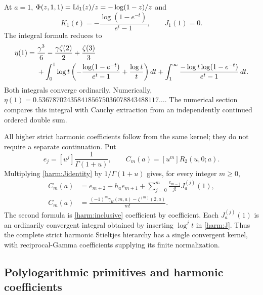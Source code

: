At $a=1$, $\Phi(z,1,1)=\operatorname{Li}_1(z)/z=-\log(1-z)/z$ and
\[
 K_1(t)=-\frac{\log(1-e^{-t})}{e^t-1},\qquad J_1(1)=0.
\]
The integral formula reduces to
\begin{align}\label{harm:etaone}
 \eta(1)={}&\frac{\gamma^3}6-\frac{\gamma\zeta(2)}2+
                \frac{\zeta(3)}3\notag\\
 &+\int_0^1\log t\left(
      -\frac{\log(1-e^{-t})}{e^t-1}+\frac{\log t}{t}\right)dt
 +\int_1^\infty\frac{-\log t\log(1-e^{-t})}{e^t-1}\,dt.
\end{align}
Both integrals converge ordinarily. Numerically,
$\eta(1)=0.5367870243584185675036078843488117\ldots$.
The numerical section compares this integral with Cauchy extraction
from an independently continued ordered double sum.

All higher strict harmonic coefficients follow from the same kernel;
they do not require a separate continuation. Put
\[
 e_j=[u^j]\frac1{\Gamma(1+u)},\qquad
 C_m(a)=[u^m]R_2(u,0;a).
\]
Multiplying \eqref{harm:Jidentity} by $1/\Gamma(1+u)$ gives, for
every integer $m\ge0$,
\begin{align}\label{harm:allcoefficients}
 C_m(a)&=e_{m+2}+h_a e_{m+1}
       +\sum_{j=0}^m\frac{e_{m-j}}{j!}J_a^{(j)}(1),\\
 C_m(a)&=\frac{(-1)^m\gamma_H(m,a)-\zeta^{(m)}(2,a)}{m!}.
                  \label{harm:allconversion}
\end{align}
The second formula is \eqref{harm:inclusive} coefficient by
coefficient. Each $J_a^{(j)}(1)$ is an ordinarily convergent integral
obtained by inserting $\log^j t$ in \eqref{harm:J}. Thus the complete
strict harmonic Stieltjes hierarchy has a single convergent kernel,
with reciprocal-Gamma coefficients supplying its finite normalization.

\subsection{Polylogarithmic primitives and harmonic coefficients}

